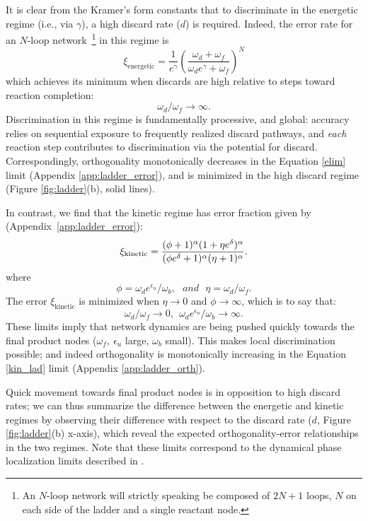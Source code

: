 It is clear from the Kramer's form constants that to discriminate in the energetic regime (i.e., via $\gamma$), a high discard rate ($d$) is required.  Indeed, the error rate for an $N$-loop network~\footnote{An $N$-loop network will strictly speaking be composed of $2N+1$ loops, $N$ on each side of the ladder and a single reactant node.} in this regime is 
\begin{equation}\label{energy_error}
\xi_{\text{energetic}} = \frac{1}{e^\gamma}\left (\frac{\omega_d+\omega_f}{\omega_d e^{\gamma}+\omega_f} \right )^N
\end{equation}
which achieves its minimum when discards are high relative to steps toward reaction completion:
\begin{equation}\label{elim}
\omega_d/\omega_f \to \infty.
\end{equation}
Discrimination in this regime is fundamentally processive, and global: accuracy relies on sequential exposure to frequently realized discard pathways, and {\it each} reaction step contributes to discrimination via the potential for discard.  Correspondingly, orthogonality monotonically decreases in the Equation \ref{elim} limit (Appendix \ref{app:ladder_error}), and is minimized in the high discard regime (Figure \ref{fig:ladder}(b), solid lines).

In contrast, we find that the kinetic regime has error fraction given by  (Appendix~\ref{app:ladder_error}):
\begin{equation}\label{general:kinetic_error}
\xi_{\rm kinetic} =  \frac{(\phi+1)^\alpha(1+\eta e^\delta)^\alpha}{(\phi e^\delta+1)^\alpha(\eta+1)^\alpha}.
\end{equation}
where 
\[
\phi = \omega_d e^{\epsilon_u}/\omega_b, \ \ \ and \ \ \ \eta =\omega_d/ \omega_f.
\]
The error $\xi_{\text{kinetic}}$ is minimized when $\eta\to0$ and $\phi\to\infty$, which is to say that:
\begin{equation}\label{kin_lad}
\omega_d/\omega_f \to 0, \ \ \omega_de^{\epsilon_u}/\omega_b \to \infty.
\end{equation}
These limits imply that network dynamics are being pushed quickly towards the final product nodes ($\omega_f,\ \epsilon_u$ large, $\omega_b$ small).  This makes local discrimination possible; and indeed orthogonality is monotonically increasing in the Equation \ref{kin_lad} limit (Appendix \ref{app:ladder_orth}).

Quick movement towards final product nodes is in opposition to high discard rates; we can thus summarize the difference between the energetic and kinetic regimes by observing their difference with respect to the discard rate ($d$, Figure \ref{fig:ladder}(b) x-axis), which reveal the expected orthogonality-error relationships in the two regimes.  Note that these limits correspond to the dynamical phase localization limits described in \cite{Murugan2016}.

